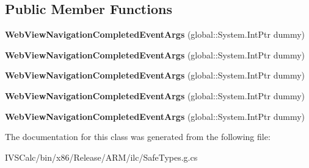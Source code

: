 \subsection*{Public Member Functions}
\begin{DoxyCompactItemize}
\item 
\mbox{\label{class_windows_1_1_u_i_1_1_xaml_1_1_controls_1_1_web_view_navigation_completed_event_args_af72b1899525a89e3b27212a59c11d236}} 
{\bfseries Web\+View\+Navigation\+Completed\+Event\+Args} (global\+::\+System.\+Int\+Ptr dummy)
\item 
\mbox{\label{class_windows_1_1_u_i_1_1_xaml_1_1_controls_1_1_web_view_navigation_completed_event_args_af72b1899525a89e3b27212a59c11d236}} 
{\bfseries Web\+View\+Navigation\+Completed\+Event\+Args} (global\+::\+System.\+Int\+Ptr dummy)
\item 
\mbox{\label{class_windows_1_1_u_i_1_1_xaml_1_1_controls_1_1_web_view_navigation_completed_event_args_af72b1899525a89e3b27212a59c11d236}} 
{\bfseries Web\+View\+Navigation\+Completed\+Event\+Args} (global\+::\+System.\+Int\+Ptr dummy)
\item 
\mbox{\label{class_windows_1_1_u_i_1_1_xaml_1_1_controls_1_1_web_view_navigation_completed_event_args_af72b1899525a89e3b27212a59c11d236}} 
{\bfseries Web\+View\+Navigation\+Completed\+Event\+Args} (global\+::\+System.\+Int\+Ptr dummy)
\item 
\mbox{\label{class_windows_1_1_u_i_1_1_xaml_1_1_controls_1_1_web_view_navigation_completed_event_args_af72b1899525a89e3b27212a59c11d236}} 
{\bfseries Web\+View\+Navigation\+Completed\+Event\+Args} (global\+::\+System.\+Int\+Ptr dummy)
\end{DoxyCompactItemize}


The documentation for this class was generated from the following file\+:\begin{DoxyCompactItemize}
\item 
I\+V\+S\+Calc/bin/x86/\+Release/\+A\+R\+M/ilc/Safe\+Types.\+g.\+cs\end{DoxyCompactItemize}
